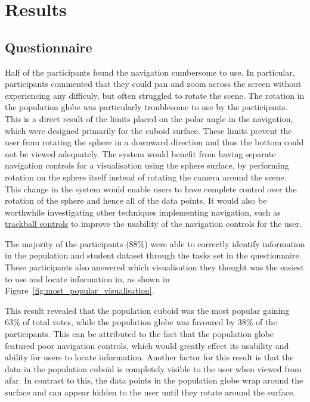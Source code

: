 \section{Results} {
\label{sec:results}

	\subsection{Questionnaire} {
	\label{sec:questionnaire}

		Half of the participants found the navigation cumbersome to use. In particular, participants commented that they could pan and zoom across the screen without experiencing any difficuly, but often struggled to rotate the scene. The rotation in the population globe was particularly troublesome to use by the participants. This is a direct result of the limits placed on the polar angle in the navigation, which were designed primarily for the cuboid surface. These limits prevent the user from rotating the sphere in a downward direction and thus the bottom could not be viewed adequately. The system would benefit from having separate navigation controls for a visualisation using the sphere surface, by performing rotation on the sphere itself instead of rotating the camera around the scene. This change in the system would enable users to have complete control over the rotation of the sphere and hence all of the data points. It would also be worthwhile investigating other techniques implementing navigation, such as \href{http://threejs.org/examples/misc_controls_trackball.html}{trackball controls} to improve the usability of the navigation controls for the user.

		The majority of the participants (88\%) were able to correctly identify information in the population and student dataset through the tasks set in the questionnaire. These participants also answered which visualisation they thought was the easiest to use and locate information in, as shown in Figure~\ref{fig:most_popular_visualisation}. 

		

		This result revealed that the population cuboid was the most popular gaining 63\% of total votes, while the population globe was favoured by 38\% of the participants. This can be attributed to the fact that the population globe featured poor navigation controls, which would greatly effect its usability and ability for users to locate information. Another factor for this result is that the data in the population cuboid is completely visible to the user when viewed from afar. In contrast to this, the data points in the population globe wrap around the surface and can appear hidden to the user until they rotate around the surface. 

}}
